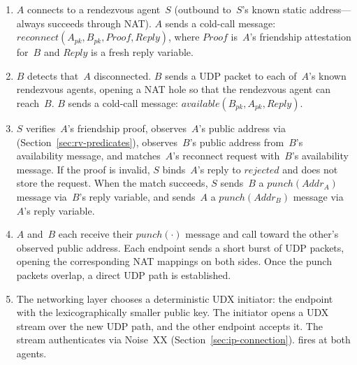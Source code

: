 
\begin{enumerate}
\item $A$ connects to a rendezvous agent~$S$ (outbound to~$S$'s known static address---always succeeds through NAT).  $A$ sends a cold-call message: $\mathit{reconnect}(A_{\mathit{pk}}, B_{\mathit{pk}}, \mathit{Proof}, \mathit{Reply})$, where $\mathit{Proof}$ is~$A$'s friendship attestation for~$B$ and $\mathit{Reply}$ is a fresh reply variable.

\item $B$ detects that~$A$ disconnected.  $B$ sends a UDP packet to each of~$A$'s known rendezvous agents, opening a NAT hole so that the rendezvous agent can reach~$B$.  $B$ sends a cold-call message: $\mathit{available}(B_{\mathit{pk}}, A_{\mathit{pk}}, \mathit{Reply})$.

\item $S$ verifies~$A$'s friendship proof, observes~$A$'s public address via
 (Section~\ref{sec:rv-predicates}), observes~$B$'s
public address from~$B$'s availability message, and matches~$A$'s reconnect
request with~$B$'s availability message. If the proof is invalid, $S$
binds~$A$'s reply to $\mathit{rejected}$ and does not store the request. When the match succeeds, $S$ sends~$B$ a
$\mathit{punch}(\mathit{Addr}_A)$ message via~$B$'s reply variable, and sends~$A$ a $\mathit{punch}(\mathit{Addr}_B)$ message via~$A$'s reply variable.


\item $A$ and~$B$ each receive their $\mathit{punch}(\cdot)$ message and call
 toward the other's observed public address. Each endpoint
sends a short burst of UDP packets, opening the corresponding NAT mappings on
both sides. Once the punch packets overlap, a direct UDP path is established.

\item The networking layer chooses a deterministic UDX initiator: the endpoint with the lexicographically
smaller public key. The initiator opens a UDX stream over the new UDP path, and the other endpoint accepts it. The stream authenticates via Noise~XX
(Section~\ref{sec:ip-connection}).  fires at both agents. 

\end{enumerate}


